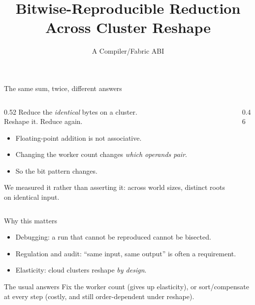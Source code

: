 \documentclass[aspectratio=169,10pt]{beamer}
\title{Bitwise-Reproducible Reduction Across Cluster Reshape}
\subtitle{A Compiler/Fabric ABI}
\author{}
\date{}
\begin{document}
\begin{frame}\titlepage\end{frame}

\begin{frame}{The same sum, twice, different answers}
\begin{columns}[T]
\begin{column}{0.52\textwidth}
\small
Reduce the \emph{identical} bytes on a cluster.\\[2pt]
Reshape it. Reduce again.
\begin{itemize}\small
  \item Floating-point addition is not associative.
  \item Changing the worker count changes \emph{which operands pair}.
  \item So the bit pattern changes.
\end{itemize}
\vspace{4pt}
We measured it rather than asserting it: across \GpuWorldSizes{} world sizes,
\GpuRootsDistinct{} distinct roots on identical input.
\end{column}
\begin{column}{0.46\textwidth}
\end{column}
\end{columns}
\end{frame}

\begin{frame}{Why this matters}
\begin{itemize}
  \item Debugging: a run that cannot be reproduced cannot be bisected.
  \item Regulation and audit: ``same input, same output'' is often a requirement.
  \item Elasticity: cloud clusters reshape \emph{by design}.
\end{itemize}
\vspace{6pt}
\begin{block}{The usual answers}
Fix the worker count (gives up elasticity), or sort/compensate at every step
(costly, and still order-dependent under reshape).
\end{block}
\end{frame}
\end{document}
